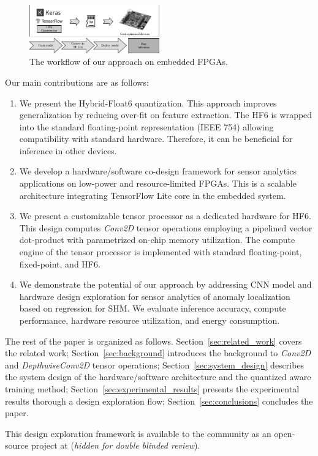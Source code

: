 
\begin{figure}[t!]
	\centering
	\includegraphics[width=0.5\textwidth]{../figures/workflow.pdf}
	\caption{The workflow of our approach on embedded FPGAs.}
	\label{fig:workflow}
\end{figure}

Our main contributions are as follows:
\begin{enumerate}
	\item We present the Hybrid-Float6 quantization. This approach improves generalization by reducing over-fit on feature extraction. The HF6 is wrapped into the standard floating-point representation (IEEE 754) allowing compatibility with standard hardware. Therefore, it can be beneficial for inference in other devices.
	\item We develop a hardware/software co-design framework for sensor analytics applications on low-power and resource-limited FPGAs. This is a scalable architecture integrating TensorFlow Lite core in the embedded system.
	\item We present a customizable tensor processor as a dedicated hardware for HF6. This design computes \emph{Conv2D} tensor operations employing a pipelined vector dot-product with parametrized on-chip memory utilization. The compute engine of the tensor processor is implemented with standard floating-point, fixed-point, and HF6.
	\item We demonstrate the potential of our approach by addressing CNN model and hardware design exploration for sensor analytics of anomaly localization based on regression for SHM. We evaluate inference accuracy, compute performance, hardware resource utilization, and energy consumption.
\end{enumerate}

The rest of the paper is organized as follows. Section~\ref{sec:related_work} covers the related work; Section~\ref{sec:background} introduces the background to \emph{Conv2D} and \emph{DepthwiseConv2D} tensor operations; Section~\ref{sec:system_design} describes the system design of the hardware/software architecture and the quantized aware training method; Section~\ref{sec:experimental_results} presents the experimental results thorough a design exploration flow; Section~\ref{sec:conclusions} concludes the paper.

This design exploration framework is available to the community as an open-source project at (\emph{hidden for double blinded review}).